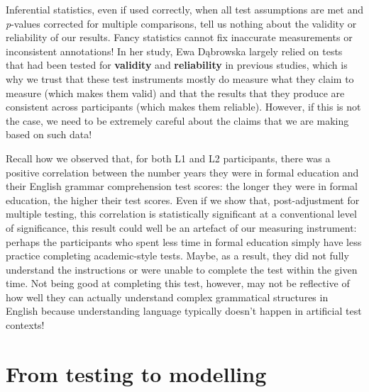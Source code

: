 \documentclass[
  letterpaper,
  DIV=11,
  numbers=noendperiod]{scrreprt}
\begin{document}
\begin{tcolorbox}[enhanced jigsaw, arc=.35mm, bottomrule=.15mm, bottomtitle=1mm, breakable, colback=white, colbacktitle=quarto-callout-note-color!10!white, colframe=quarto-callout-note-color-frame, coltitle=black, left=2mm, leftrule=.75mm, opacityback=0, opacitybacktitle=0.6, rightrule=.15mm, title=\textcolor{quarto-callout-note-color}{\faInfo}\hspace{0.5em}{In search of the truth\ldots{}}, titlerule=0mm, toprule=.15mm, toptitle=1mm]

Inferential statistics, even if used correctly, when all test
assumptions are met and \emph{p}-values corrected for multiple
comparisons, tell us nothing about the validity or reliability of our
results. Fancy statistics cannot fix inaccurate measurements or
inconsistent annotations! In her study, Ewa Dąbrowska largely relied on
tests that had been tested for \textbf{validity} and
\textbf{reliability} in previous studies, which is why we trust that
these test instruments mostly do measure what they claim to measure
(which makes them valid) and that the results that they produce are
consistent across participants (which makes them reliable). However, if
this is not the case, we need to be extremely careful about the claims
that we are making based on such data!

Recall how we observed that, for both L1 and L2 participants, there was
a positive correlation between the number years they were in formal
education and their English grammar comprehension test scores: the
longer they were in formal education, the higher their test scores. Even
if we show that, post-adjustment for multiple testing, this correlation
is statistically significant at a conventional level of significance,
this result could well be an artefact of our measuring instrument:
perhaps the participants who spent less time in formal education simply
have less practice completing academic-style tests. Maybe, as a result,
they did not fully understand the instructions or were unable to
complete the test within the given time. Not being good at completing
this test, however, may not be reflective of how well they can actually
understand complex grammatical structures in English because
understanding language typically doesn't happen in artificial test
contexts!

\end{tcolorbox}

\section{From testing to modelling}\label{from-testing-to-modelling}
\end{document}
